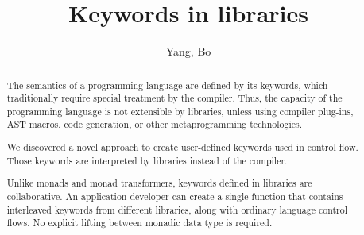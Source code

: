 \documentclass[acmsmall,10pt,review,screen,anonymous]{acmart}
\begin{document}
\title{Keywords in libraries}

\author{Yang, Bo}


\begin{abstract}
The semantics of a programming language are defined by its keywords, which traditionally require special treatment by the compiler. Thus, the capacity of the programming language is not extensible by libraries, unless using compiler plug-ins, AST macros, code generation, or other metaprogramming technologies.

We discovered a novel approach to create user-defined keywords used in control flow. Those keywords are interpreted by libraries instead of the compiler.

Unlike monads and monad transformers, keywords defined in libraries are collaborative. An application developer can create a single function that contains interleaved keywords from different libraries, along with ordinary language control flows. No explicit lifting between monadic data type is required.
\end{abstract}
\end{document}
